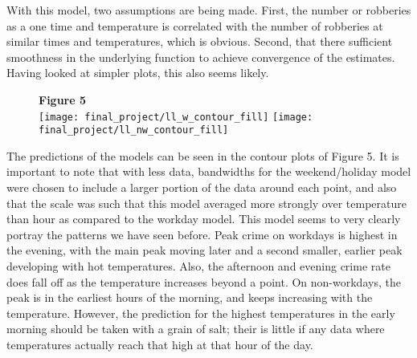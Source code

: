 \documentclass[11pt]{article}
\theoremstyle{definition}
\begin{document}
With this model, two assumptions are being made. First, the number or robberies as a one time and temperature is correlated with the number of robberies at similar times and temperatures, which is obvious. Second, that there sufficient smoothness in the underlying function to achieve convergence of the estimates. Having looked at simpler plots, this also seems likely. \par
\begin{figure}[h]
    {\bf Figure 5} \\
    \texttt{[image: final\_project/ll\_w\_contour\_fill]}
    \texttt{[image: final\_project/ll\_nw\_contour\_fill]}
\end{figure}
\FloatBarrier
The predictions of the models can be seen in the contour plots of Figure 5. It is important to note that with less data, bandwidths for the weekend/holiday model were chosen to include a larger portion of the data around each point, and also that the scale was such that this model averaged more strongly over temperature than hour as compared to the workday model. This model seems to very clearly portray the patterns we have seen before. Peak crime on workdays is highest in the evening, with the main peak moving later and a second smaller, earlier peak developing with hot temperatures. Also, the afternoon and evening crime rate does fall off as the temperature increases beyond a point. On non-workdays, the peak is in the earliest hours of the morning, and keeps increasing with the temperature. However, the prediction for the highest temperatures in the early morning should be taken with a grain of salt; their is little if any data where temperatures actually reach that high at that hour of the day.
\FloatBarrier
\end{document}
